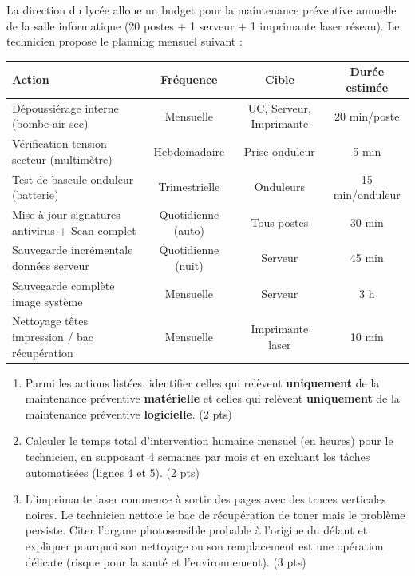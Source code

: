 \documentclass[11pt]{article}
\begin{document}
\begin{exercice}
La direction du lycée alloue un budget pour la maintenance préventive annuelle de la salle informatique (20 postes + 1 serveur + 1 imprimante laser réseau). Le technicien propose le planning mensuel suivant :
\begin{center}
\begin{tabular}{|l|c|c|c|}
\hline
\textbf{Action} & \textbf{Fréquence} & \textbf{Cible} & \textbf{Durée estimée} \\
\hline
Dépoussiérage interne (bombe air sec) & Mensuelle & UC, Serveur, Imprimante & 20 min/poste \\
\hline
Vérification tension secteur (multimètre) & Hebdomadaire & Prise onduleur & 5 min \\
\hline
Test de bascule onduleur (batterie) & Trimestrielle & Onduleurs & 15 min/onduleur \\
\hline
Mise à jour signatures antivirus + Scan complet & Quotidienne (auto) & Tous postes & 30 min \\
\hline
Sauvegarde incrémentale données serveur & Quotidienne (nuit) & Serveur & 45 min \\
\hline
Sauvegarde complète image système & Mensuelle & Serveur & 3 h \\
\hline
Nettoyage têtes impression / bac récupération & Mensuelle & Imprimante laser & 10 min \\
\hline
\end{tabular}
\end{center}
\begin{enumerate}
    \item Parmi les actions listées, identifier celles qui relèvent \textbf{uniquement} de la maintenance préventive \textbf{matérielle} et celles qui relèvent \textbf{uniquement} de la maintenance préventive \textbf{logicielle}. (2 pts)
    \item Calculer le temps total d'intervention humaine mensuel (en heures) pour le technicien, en supposant 4 semaines par mois et en excluant les tâches automatisées (lignes 4 et 5). (2 pts)
    \item L'imprimante laser commence à sortir des pages avec des traces verticales noires. Le technicien nettoie le bac de récupération de toner mais le problème persiste. Citer l'organe photosensible probable à l'origine du défaut et expliquer pourquoi son nettoyage ou son remplacement est une opération délicate (risque pour la santé et l'environnement). (3 pts)
\end{enumerate}
\end{exercice}
\end{document}
